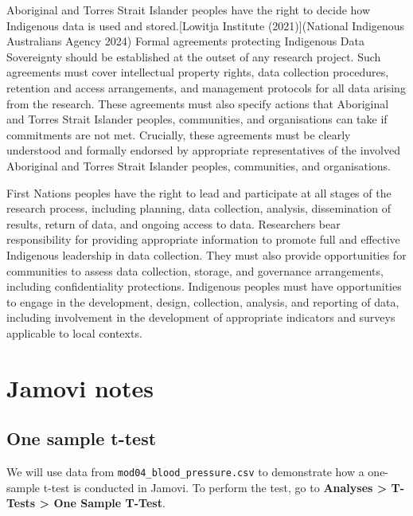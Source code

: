 \documentclass[
  a4paper,
]{memoir}
\begin{document}
Aboriginal and Torres Strait Islander peoples have the right to decide
how Indigenous data is used and stored.{[}Lowitja Institute
(2021){]}(National Indigenous Australians Agency 2024) Formal agreements
protecting Indigenous Data Sovereignty should be established at the
outset of any research project. Such agreements must cover intellectual
property rights, data collection procedures, retention and access
arrangements, and management protocols for all data arising from the
research. These agreements must also specify actions that Aboriginal and
Torres Strait Islander peoples, communities, and organisations can take
if commitments are not met. Crucially, these agreements must be clearly
understood and formally endorsed by appropriate representatives of the
involved Aboriginal and Torres Strait Islander peoples, communities, and
organisations.

First Nations peoples have the right to lead and participate at all
stages of the research process, including planning, data collection,
analysis, dissemination of results, return of data, and ongoing access
to data. Researchers bear responsibility for providing appropriate
information to promote full and effective Indigenous leadership in data
collection. They must also provide opportunities for communities to
assess data collection, storage, and governance arrangements, including
confidentiality protections. Indigenous peoples must have opportunities
to engage in the development, design, collection, analysis, and
reporting of data, including involvement in the development of
appropriate indicators and surveys applicable to local contexts.

\newpage{}


\chapter*{Jamovi notes}\label{jamovi-notes-2}


\section{One sample t-test}\label{one-sample-t-test-1}

We will use data from \texttt{mod04\_blood\_pressure.csv} to demonstrate
how a one-sample t-test is conducted in Jamovi. To perform the test, go
to \textbf{Analyses \textgreater{} T-Tests \textgreater{} One Sample
T-Test}.
\end{document}
